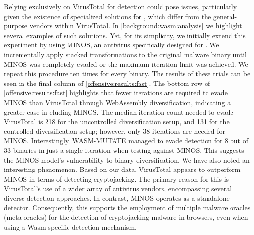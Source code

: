 Relying exclusively on VirusTotal for detection could pose issues, particularly given the existence of specialized solutions for \Wasm, which differ from the general-purpose vendors within VirusTotal. 
In \autoref{background:wasm:analysis} we highlight several examples of such solutions.
Yet, for its simplicity, we initially extend this experiment by using MINOS\cite{MINOS}, an antivirus specifically designed for \Wasm. 
We incrementally apply stacked transformations to the original malware binary until MINOS was completely evaded or the maximum iteration limit was achieved. 
We repeat this procedure ten times for every binary. 
The results of these trials can be seen in the final column of \autoref{offensive:results:fast}.
The bottom row of \autoref{offensive:results:fast} highlights that fewer iterations are required to evade MINOS than VirusTotal through WebAssembly diversification, indicating a greater ease in eluding MINOS.
The median iteration count needed to evade VirusTotal is 218 for the uncontrolled diversification setup, and 131 for the controlled diversification setup; however, only 38 iterations are needed for MINOS.
Interestingly, WASM-MUTATE managed to evade detection for 8 out of 33 binaries in just a single iteration when testing against MINOS.
This suggests the MINOS model's vulnerability to binary diversification. 
We have also noted an interesting phenomenon.
Based on our data, VirusTotal appears to outperform MINOS in terms of detecting cryptojacking. 
The primary reason for this is VirusTotal's use of a wider array of antivirus vendors, encompassing several diverse detection approaches. 
In contrast, MINOS operates as a standalone detector.
Consequently, this supports the employment of multiple malware oracles (meta-oracles) for the detection of cryptojacking malware in browsers, even when using a Wasm-specific detection mechanism.






